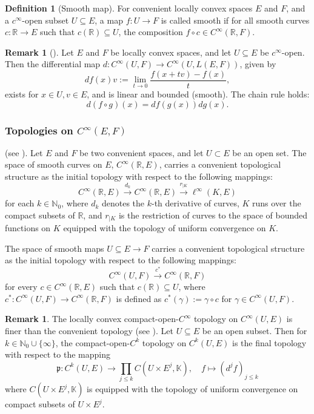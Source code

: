 \documentclass[11pt,reqno]{amsart}
\theoremstyle{definition}
\newtheorem{definition}[theorem]{Definition}
\newtheorem{remark}[theorem]{Remark}
\numberwithin{equation}{section}
\begin{document}
\begin{definition}[Smooth map]
For convenient locally convex spaces $E$ and $F$, and a $c^\infty$-open subset $U \subseteq E$, a map $f: U \rightarrow F$ is called smooth if for all smooth curves $c: \mathbb{R} \rightarrow E$ such that $c(\mathbb{R}) \subseteq U$, the composition $f \circ c \in C^\infty(\mathbb{R}, F)$.
\end{definition}

\begin{remark}[{\cite[Theorem 3.18]{20}}]
Let $E$ and $F$ be locally convex spaces, and let $U \subseteq E$ be $c^{\infty}$-open. Then the differential map $d: C^{\infty}(U, F) \rightarrow C^{\infty}(U, L(E, F))$, given by
\[
df(x)v := \lim_{t \rightarrow 0} \frac{f(x+tv) - f(x)}{t},
\]
exists for $x \in U, v \in E$, and is linear and bounded (smooth). The chain rule holds:
\[
d(f \circ g)(x) = df(g(x)) dg(x).
\]
\end{remark}

\subsubsection{Topologies on $C^{\infty}(E,F)$}
(see \cite[Definition 3.6, Definition 3.11]{20}). Let $E$ and $F$ be two convenient spaces, and let $U \subset E$ be an open set. The space of smooth curves on $E$, $C^{\infty}(\mathbb{R}, E)$, carries a convenient topological structure as the initial topology with respect to the following mappings:
\[
C^{\infty}(\mathbb{R}, E) \xrightarrow{d_k} C^{\infty}(\mathbb{R}, E) \xrightarrow{r_{|K}} \ell^{\infty}(K, E)
\]
for each $k \in \mathbb{N}_{0}$, where $d_{k}$ denotes the $k$-th derivative of curves, $K$ runs over the compact subsets of $\mathbb{R}$, and $r_{|K}$ is the restriction of curves to the space of bounded functions on $K$ equipped with the topology of uniform convergence on $K$.

The space of smooth maps $U \subseteq E \rightarrow F$ carries a convenient topological structure as the initial topology with respect to the following mappings:
\[
C^{\infty}(U, F) \xrightarrow{c^{*}} C^{\infty}(\mathbb{R}, F)
\]
for every $c \in C^{\infty}(\mathbb{R}, E)$ such that $c(\mathbb{R}) \subseteq U$, where $c^{*}: C^{\infty}(U, F) \rightarrow C^{\infty}(\mathbb{R}, F)$ is defined as $c^{*}(\gamma) := \gamma \circ c$ for $\gamma \in C^{\infty}(U, F)$.

\begin{remark}
The locally convex compact-open-$C^{\infty}$ topology on $C^{\infty}(U, E)$ is finer than the convenient topology (see \cite[1.7]{11}). Let $U \subseteq E$ be an open subset. Then for $k \in \mathbb{N}_{0} \cup \{\infty\}$, the compact-open-$C^{k}$ topology on $C^{k}(U, E)$ is the final topology with respect to the mapping
\[
\mathfrak{p}: C^{k}(U, E) \rightarrow \prod_{j \le k} C(U \times E^{j}, \mathbb{K}), \quad f \mapsto (d^{j}f)_{j \le k}
\]
where $C(U \times E^{j}, \mathbb{K})$ is equipped with the topology of uniform convergence on compact subsets of $U \times E^{j}$.
\end{remark}
\end{document}
